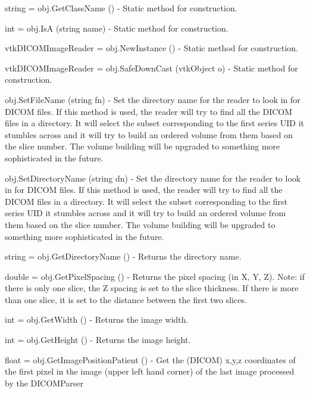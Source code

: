 \begin{DoxyItemize}
\item {\ttfamily string = obj.\-Get\-Class\-Name ()} -\/ Static method for construction.  
\item {\ttfamily int = obj.\-Is\-A (string name)} -\/ Static method for construction.  
\item {\ttfamily vtk\-D\-I\-C\-O\-M\-Image\-Reader = obj.\-New\-Instance ()} -\/ Static method for construction.  
\item {\ttfamily vtk\-D\-I\-C\-O\-M\-Image\-Reader = obj.\-Safe\-Down\-Cast (vtk\-Object o)} -\/ Static method for construction.  
\item {\ttfamily obj.\-Set\-File\-Name (string fn)} -\/ Set the directory name for the reader to look in for D\-I\-C\-O\-M files. If this method is used, the reader will try to find all the D\-I\-C\-O\-M files in a directory. It will select the subset corresponding to the first series U\-I\-D it stumbles across and it will try to build an ordered volume from them based on the slice number. The volume building will be upgraded to something more sophisticated in the future.  
\item {\ttfamily obj.\-Set\-Directory\-Name (string dn)} -\/ Set the directory name for the reader to look in for D\-I\-C\-O\-M files. If this method is used, the reader will try to find all the D\-I\-C\-O\-M files in a directory. It will select the subset corresponding to the first series U\-I\-D it stumbles across and it will try to build an ordered volume from them based on the slice number. The volume building will be upgraded to something more sophisticated in the future.  
\item {\ttfamily string = obj.\-Get\-Directory\-Name ()} -\/ Returns the directory name.  
\item {\ttfamily double = obj.\-Get\-Pixel\-Spacing ()} -\/ Returns the pixel spacing (in X, Y, Z). Note\-: if there is only one slice, the Z spacing is set to the slice thickness. If there is more than one slice, it is set to the distance between the first two slices.  
\item {\ttfamily int = obj.\-Get\-Width ()} -\/ Returns the image width.  
\item {\ttfamily int = obj.\-Get\-Height ()} -\/ Returns the image height.  
\item {\ttfamily float = obj.\-Get\-Image\-Position\-Patient ()} -\/ Get the (D\-I\-C\-O\-M) x,y,z coordinates of the first pixel in the image (upper left hand corner) of the last image processed by the D\-I\-C\-O\-M\-Parser  

\end{DoxyItemize}
